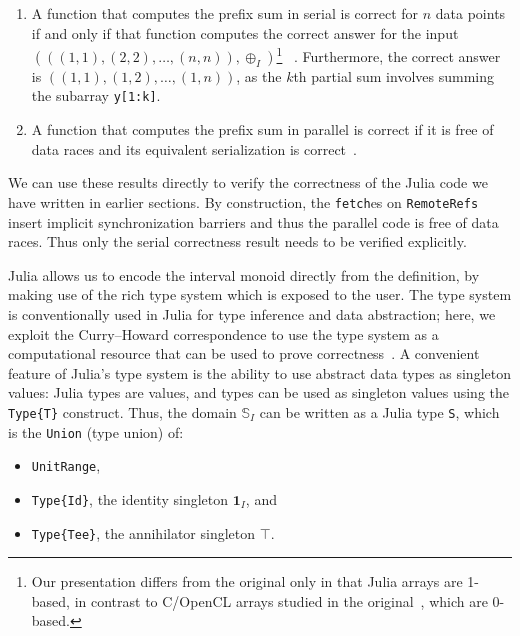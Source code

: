 \documentclass{sig-alternate}
\newcommand{\code}[1]{\texttt{#1}}
\begin{document}
\begin{enumerate}
		
\item 	A function that computes the prefix sum in serial is correct for $n$
	data points if and only if that function computes the correct answer
	for the input \\
	$\left(\left((1, 1), (2, 2), \dots, (n, n)\right),
	\oplus_I\right)$\footnote{Our presentation differs from the original
	only in that Julia arrays are 1-based, in contrast to C/OpenCL arrays
	studied in the original~\cite{Chong2014}, which are 0-based.}
	~\cite[Theorem 4.5]{Chong2014}.
	Furthermore, the correct answer is $\left((1, 1), (1, 2), \dots, (1, n)
	\right)$, as the $k$th partial sum involves summing the subarray
	\code{y[1:k]}.
	
\item	A function that computes the prefix sum in parallel is correct if it is
	free of data races and its equivalent serialization is
	correct~\cite[Theorem 5.3]{Chong2014}.

\end{enumerate}

We can use these results directly to verify the correctness of the Julia code
we have written in earlier sections. By construction, the \code{fetch}es on
\code{RemoteRefs} insert implicit synchronization barriers and thus the
parallel code is free of data races. Thus only the serial correctness result
needs to be verified explicitly.

Julia allows us to encode the interval monoid directly from the definition, by
making use of the rich type system which is exposed to the user. The type
system is conventionally used in Julia for type inference and data abstraction;
here, we exploit the Curry--Howard correspondence to use the type system as a
computational resource that can be used to prove
correctness~\cite{Curry1958,Tait1965,Howard1980}. A convenient feature of
Julia's type system is the ability to use abstract data types as
singleton values: Julia types are values, and types can be used as singleton
values using the \code{Type\{T\}} construct. Thus, the domain $\mathbb S_I$ can
be written as a Julia type \code{S}, which is the \code{Union} (type union) of:

\begin{itemize}
	\item \code{UnitRange},
	\item \code{Type\{Id\}}, the identity singleton $\mathbf 1_I$, and
	\item \code{Type\{Tee\}}, the annihilator singleton $\top$.
\end{itemize}
\end{document}
